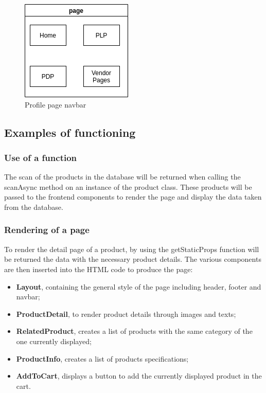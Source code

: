 \begin{figure}[!ht]
  \caption{Profile page navbar}
  \vspace{10px}
  \includegraphics[scale=0.3]{../../../../Images/Diagrammi/maintainerManual/FEgraph.png}
  \centering
\end{figure}


\subsection{Examples of functioning}
\subsubsection{Use of a function}
The scan of the products in the database will be returned when calling the scanAsync method on an instance of the product class. These products will be passed to the frontend components to render the page and display the data taken from the database.
\subsubsection{Rendering of a page}
To render the detail page of a product, by using the getStaticProps function will be returned the data with the necessary product details. The various components are then inserted into the HTML code to produce the page:
\begin{itemize}
  \item \textbf{Layout}, containing the general style of the page including header, footer and navbar;
  \item \textbf{ProductDetail}, to render product details through images and texts;
  \item \textbf{RelatedProduct}, creates a list of products with the same category of the one currently displayed;
  \item \textbf{ProductInfo}, creates a list of products specifications;
  \item \textbf{AddToCart}, displays a button to add the currently displayed product in the cart.
\end{itemize}

